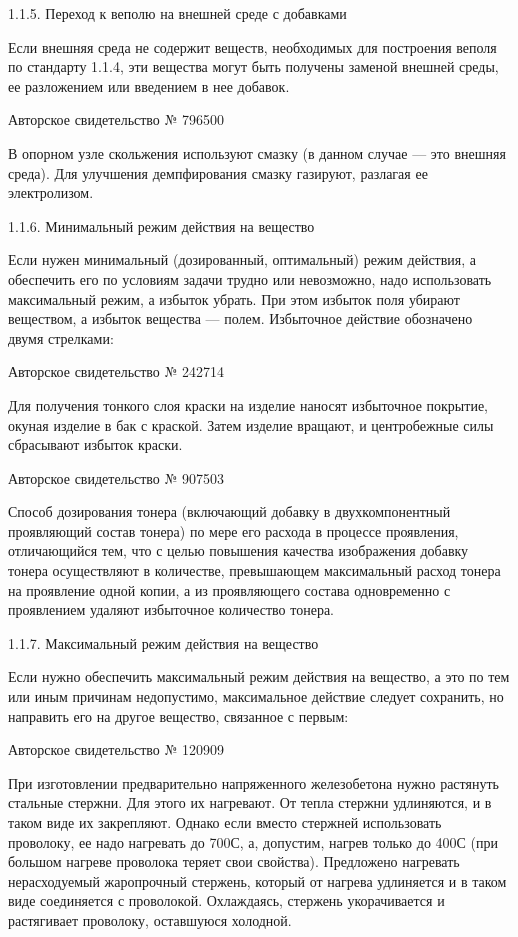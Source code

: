 1.1.5. Переход к веполю на внешней среде с добавками

Если  внешняя среда  не содержит  веществ, необходимых  для построения
веполя по  стандарту 1.1.4, эти  вещества могут быть  получены заменой
внешней среды, ее разложением или введением в нее добавок.

Авторское свидетельство № 796500

В опорном  узле скольжения  используют смазку (в  данном случае  — это
внешняя среда). Для улучшения  демпфирования смазку газируют, разлагая
ее электролизом.

1.1.6. Минимальный режим действия на вещество

Если  нужен минимальный  (дозированный,  оптимальный) режим  действия,
а  обеспечить  его по  условиям  задачи  трудно или  невозможно,  надо
использовать максимальный  режим, а  избыток убрать. При  этом избыток
поля  убирают  веществом,  а  избыток  вещества  —  полем.  Избыточное
действие обозначено двумя стрелками:


Авторское свидетельство № 242714

Для  получения  тонкого  слоя  краски на  изделие  наносят  избыточное
покрытие, окуная  изделие в  бак с краской.  Затем изделие  вращают, и
центробежные силы сбрасывают избыток краски.

Авторское свидетельство № 907503

Способ  дозирования  тонера  (включающий  добавку  в  двухкомпонентный
проявляющий состав тонера) по мере  его расхода в процессе проявления,
отличающийся тем,  что с целью повышения  качества изображения добавку
тонера  осуществляют  в  количестве, превышающем  максимальный  расход
тонера  на   проявление  одной   копии,  а  из   проявляющего  состава
одновременно с проявлением удаляют избыточное количество тонера.


1.1.7. Максимальный режим действия на вещество

Если нужно обеспечить  максимальный режим действия на  вещество, а это
по тем  или иным  причинам недопустимо, максимальное  действие следует
сохранить, но направить его на другое вещество, связанное с первым:


Авторское свидетельство № 120909

При  изготовлении   предварительно  напряженного   железобетона  нужно
растянуть стальные стержни.  Для этого их нагревают.  От тепла стержни
удлиняются, и в таком виде  их закрепляют. Однако если вместо стержней
использовать  проволоку,  ее надо  нагревать  до  700С, а,  допустим,
нагрев  только до  400С (при  большом нагреве  проволока теряет  свои
свойства).  Предложено нагревать  нерасходуемый жаропрочный  стержень,
который от нагрева удлиняется и в таком виде соединяется с проволокой.
Охлаждаясь, стержень укорачивается и растягивает проволоку, оставшуюся
холодной.


